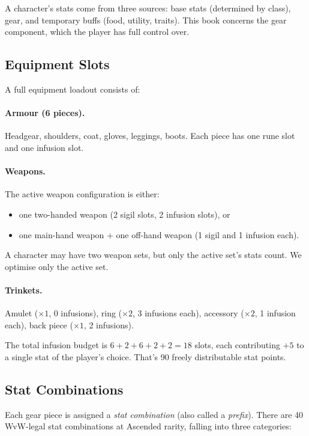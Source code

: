 \documentclass[11pt, a4paper, oneside]{book}
\begin{document}
A character's stats come from three sources: base stats (determined by class),
gear, and temporary buffs (food, utility, traits).  This book concerns the
gear component, which the player has full control over.

\subsection{Equipment Slots}

A full equipment loadout consists of:

\paragraph{Armour (6 pieces).} Headgear, shoulders, coat, gloves, leggings,
boots.  Each piece has one rune slot and one infusion slot.

\paragraph{Weapons.}  The active weapon configuration is either:
\begin{itemize}[nosep]
  \item one two-handed weapon (2 sigil slots, 2 infusion slots), or
  \item one main-hand weapon + one off-hand weapon (1 sigil and 1 infusion each).
\end{itemize}
A character may have two weapon sets, but only the active set's stats count.
We optimise only the active set.

\paragraph{Trinkets.}  Amulet ($\times 1$, 0 infusions), ring ($\times 2$,
3 infusions each), accessory ($\times 2$, 1 infusion each), back piece
($\times 1$, 2 infusions).

The total infusion budget is $6 + 2 + 6 + 2 + 2 = 18$ slots, each contributing
$+5$ to a single stat of the player's choice.  That's 90 freely distributable
stat points.

\subsection{Stat Combinations}

Each gear piece is assigned a \emph{stat combination} (also called a
\emph{prefix}).  There are 40 WvW-legal stat combinations at Ascended rarity,
falling into three categories:
\end{document}
